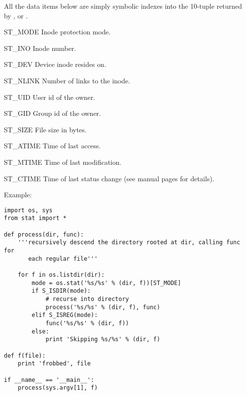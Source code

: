 All the data items below are simply symbolic indexes into the 10-tuple
returned by ,  or
.

\begin{datadesc}{ST_MODE}
Inode protection mode.
\end{datadesc}

\begin{datadesc}{ST_INO}
Inode number.
\end{datadesc}

\begin{datadesc}{ST_DEV}
Device inode resides on.
\end{datadesc}

\begin{datadesc}{ST_NLINK}
Number of links to the inode.
\end{datadesc}

\begin{datadesc}{ST_UID}
User id of the owner.
\end{datadesc}

\begin{datadesc}{ST_GID}
Group id of the owner.
\end{datadesc}

\begin{datadesc}{ST_SIZE}
File size in bytes.
\end{datadesc}

\begin{datadesc}{ST_ATIME}
Time of last access.
\end{datadesc}

\begin{datadesc}{ST_MTIME}
Time of last modification.
\end{datadesc}

\begin{datadesc}{ST_CTIME}
Time of last status change (see manual pages for details).
\end{datadesc}

Example:

\begin{verbatim}
import os, sys
from stat import *

def process(dir, func):
    '''recursively descend the directory rooted at dir, calling func for
       each regular file'''

    for f in os.listdir(dir):
        mode = os.stat('%s/%s' % (dir, f))[ST_MODE]
        if S_ISDIR(mode):
            # recurse into directory
            process('%s/%s' % (dir, f), func)
        elif S_ISREG(mode):
            func('%s/%s' % (dir, f))
        else:
            print 'Skipping %s/%s' % (dir, f)

def f(file):
    print 'frobbed', file

if __name__ == '__main__':
    process(sys.argv[1], f)
\end{verbatim}
